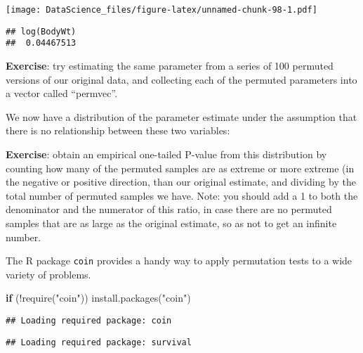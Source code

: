 \documentclass[
]{book}
\newenvironment{Shaded}{\begin{snugshade}}{\end{snugshade}}
\newcommand{\AttributeTok}[1]{\textcolor[rgb]{0.77,0.63,0.00}{#1}}
\newcommand{\ControlFlowTok}[1]{\textcolor[rgb]{0.13,0.29,0.53}{\textbf{#1}}}
\newcommand{\DecValTok}[1]{\textcolor[rgb]{0.00,0.00,0.81}{#1}}
\newcommand{\FunctionTok}[1]{\textcolor[rgb]{0.00,0.00,0.00}{#1}}
\newcommand{\NormalTok}[1]{#1}
\newcommand{\OtherTok}[1]{\textcolor[rgb]{0.56,0.35,0.01}{#1}}
\newcommand{\SpecialCharTok}[1]{\textcolor[rgb]{0.00,0.00,0.00}{#1}}
\newcommand{\StringTok}[1]{\textcolor[rgb]{0.31,0.60,0.02}{#1}}
\begin{document}
\texttt{[image: DataScience\_files/figure-latex/unnamed-chunk-98-1.pdf]}

\begin{Shaded}
\end{Shaded}

\begin{verbatim}
## log(BodyWt) 
##  0.04467513
\end{verbatim}

\textbf{Exercise}: try estimating the same parameter from a series of 100 permuted versions of our original data, and collecting each of the permuted parameters into a vector called ``permvec''.

We now have a distribution of the parameter estimate under the assumption that there is no relationship between these two variables:

\textbf{Exercise}: obtain an empirical one-tailed P-value from this distribution by counting how many of the permuted samples are as extreme or more extreme (in the negative or positive direction, than our original estimate, and dividing by the total number of permuted samples we have. Note: you should add a 1 to both the denominator and the numerator of this ratio, in case there are no permuted samples that are as large as the original estimate, so as not to get an infinite number.

The R package \texttt{coin} provides a handy way to apply permutation tests to a wide variety of problems.

\begin{Shaded}
\begin{Highlighting}[]
\ControlFlowTok{if}\NormalTok{ (}\SpecialCharTok{!}\FunctionTok{require}\NormalTok{(}\StringTok{"coin"}\NormalTok{)) }\FunctionTok{install.packages}\NormalTok{(}\StringTok{"coin"}\NormalTok{)}
\end{Highlighting}
\end{Shaded}

\begin{verbatim}
## Loading required package: coin
\end{verbatim}

\begin{verbatim}
## Loading required package: survival
\end{verbatim}
\end{document}
